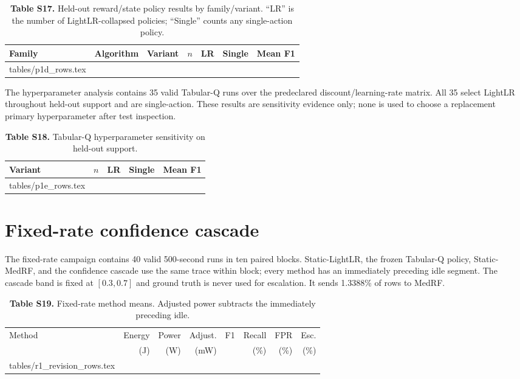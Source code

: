 \documentclass[10pt,a4paper]{article}
\makeatletter
\newcommand{\tableinput}[1]{\@@input #1.tex }
\makeatother
\begin{document}
\begin{table}[h!]
\centering\footnotesize
\caption*{\textbf{Table S17.} Held-out reward/state policy results by family/variant. ``LR'' is the number of LightLR-collapsed policies; ``Single'' counts any single-action policy.}
\setlength{\tabcolsep}{3.2pt}
\begin{tabular}{lllrrrr}\toprule
Family & Algorithm & Variant & $n$ & LR & Single & Mean F1\\\midrule
\tableinput{tables/p1d_rows}
\bottomrule\end{tabular}
\end{table}

The hyperparameter analysis contains 35 valid Tabular-Q runs over the predeclared discount/learning-rate matrix. All 35 select LightLR throughout held-out support and are single-action. These results are sensitivity evidence only; none is used to choose a replacement primary hyperparameter after test inspection.

\begin{table}[h!]
\centering\footnotesize
\caption*{\textbf{Table S18.} Tabular-Q hyperparameter sensitivity on held-out support.}
\begin{tabular}{lrrrr}\toprule
Variant & $n$ & LR & Single & Mean F1\\\midrule
\tableinput{tables/p1e_rows}
\bottomrule\end{tabular}
\end{table}

\clearpage
\section{Fixed-rate confidence cascade}
The fixed-rate campaign contains 40 valid 500-second runs in ten paired blocks. Static-LightLR, the frozen Tabular-Q policy, Static-MedRF, and the confidence cascade use the same trace within block; every method has an immediately preceding idle segment. The cascade band is fixed at $[0.3,0.7]$ and ground truth is never used for escalation. It sends 1.3388\% of rows to MedRF.

\begin{table}[h!]
\centering\footnotesize
\caption*{\textbf{Table S19.} Fixed-rate method means. Adjusted power subtracts the immediately preceding idle.}
\setlength{\tabcolsep}{3.0pt}
\begin{tabular}{lrrrrrrr}\toprule
Method & Energy & Power & Adjust. & F1 & Recall & FPR & Esc.\\
 & (J) & (W) & (mW) & & (\%) & (\%) & (\%)\\\midrule
\tableinput{tables/r1_revision_rows}
\bottomrule\end{tabular}
\end{table}
\end{document}
